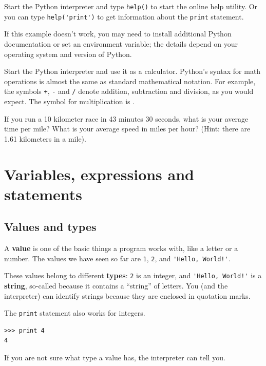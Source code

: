 \documentclass[10pt]{book}
\begin{document}
\begin{ex}
Start the Python interpreter and type {\tt help()} to start the online
help utility.  Or you can type \verb"help('print')" to get information
about the {\tt print} statement.

If this example doesn't work, you
may need to install additional Python documentation or set an
environment variable; the details depend on your operating system and
version of Python.

\end{ex}

\begin{ex}
Start the Python interpreter and use it as a calculator.
Python's syntax for math operations is almost the same as
standard mathematical notation.  For example, the symbols
{\tt +}, {\tt -} and {\tt /} denote addition, subtraction
and division, as you would expect.  The symbol for
multiplication is {\tt *}.

If you run a 10 kilometer race in 43 minutes 30 seconds, what is your
average time per mile?  What is your average speed in miles per hour?
(Hint: there are 1.61 kilometers in a mile).


\end{ex}

\chapter{Variables, expressions and statements}

\section{Values and types}

A {\bf value} is one of the basic things a program works with,
like a letter or a
number.  The values we have seen so far
are {\tt 1}, {\tt 2}, and
\verb"'Hello, World!'".

These values belong to different {\bf types}:
{\tt 2} is an integer, and \verb"'Hello, World!'" is a {\bf string},
so-called because it contains a ``string'' of letters.
You (and the interpreter) can identify
strings because they are enclosed in quotation marks.


The {\tt print} statement also works for integers.

\beforeverb
\begin{verbatim}
>>> print 4
4
\end{verbatim}
\afterverb
%
If you are not sure what type a value has, the interpreter can tell you.
\end{document}
